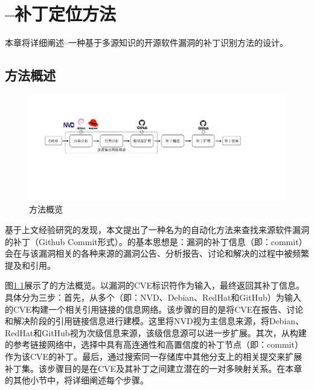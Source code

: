 \chapter{\tool --补丁定位方法}

本章将详细阐述\tool --一种基于多源知识的开源软件漏洞的补丁识别方法的设计。

\section{方法概述}
\begin{figure}[h]
    \centering
    \includegraphics[scale=0.40]{res/overview.pdf}
    \caption{\tool 方法概览}\label{fig:overview}
\end{figure}

基于上文经验研究的发现，本文提出了一种名为\tool 的自动化方法来查找来源软件漏洞的补丁（Github Commit形式）。\tool 的基本思想是：漏洞的补丁信息（即：commit）会在与该漏洞相关的各种来源的漏洞公告、分析报告、讨论和解决的过程中被频繁提及和引用。

图\ref{fig:overview}展示了\tool 的方法概览。\tool 以漏洞的CVE标识符作为输入，最终返回其补丁信息。具体分为三步：首先，\tool 从多个（即：NVD、Debian\cite{debian}、RedHat\cite{redhat}和GitHub）为输入的CVE构建一个相关引用链接的信息网络。该步骤的目的是将CVE在报告、讨论和解决阶段的引用链接信息进行建模。这里将NVD视为主信息来源，将Debian、RedHat和GitHub视为次级信息来源，该级信息源可以进一步扩展。其次，\tool 从构建的参考链接网络中，选择中具有高连通性和高置信度的补丁节点（即：commit）作为该CVE的补丁。最后，\tool 通过搜索同一存储库中其他分支上的相关提交来扩展补丁集。该步骤目的是在CVE及其补丁之间建立潜在的一对多映射关系。在本章的其他小节中，将详细阐述每个步骤。


